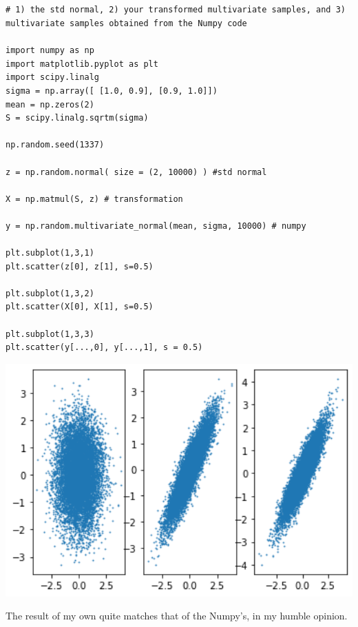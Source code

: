 \documentclass{article}
\begin{document}
\subsection{}
\begin{lstlisting}
# 1) the std normal, 2) your transformed multivariate samples, and 3) multivariate samples obtained from the Numpy code

import numpy as np
import matplotlib.pyplot as plt
import scipy.linalg
sigma = np.array([ [1.0, 0.9], [0.9, 1.0]])
mean = np.zeros(2)
S = scipy.linalg.sqrtm(sigma)

np.random.seed(1337)

z = np.random.normal( size = (2, 10000) ) #std normal

X = np.matmul(S, z) # transformation

y = np.random.multivariate_normal(mean, sigma, 10000) # numpy

plt.subplot(1,3,1)
plt.scatter(z[0], z[1], s=0.5)

plt.subplot(1,3,2)
plt.scatter(X[0], X[1], s=0.5)

plt.subplot(1,3,3)
plt.scatter(y[...,0], y[...,1], s = 0.5)
\end{lstlisting}

\begin{center}
    \includegraphics[width=1\textwidth]{images/5.png}
\end{center}
The result of my own quite matches that of the Numpy's, in my humble opinion.
\end{document}
